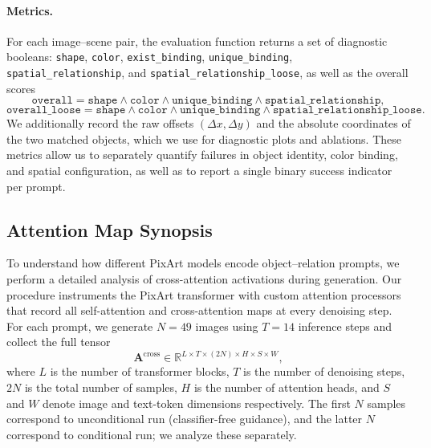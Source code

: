 \documentclass[10pt,twocolumn,letterpaper]{article}
\begin{document}
\paragraph{Metrics.}
For each image–scene pair, the evaluation function returns a set of diagnostic booleans:
\texttt{shape}, \texttt{color}, \texttt{exist\_binding}, \texttt{unique\_binding}, \texttt{spatial\_relationship}, and \texttt{spatial\_relationship\_loose}, as well as the overall scores
\[
\texttt{overall} = \texttt{shape} \land \texttt{color} \land \texttt{unique\_binding} \land \texttt{spatial\_relationship},
\]
\[
\texttt{overall\_loose} = \texttt{shape} \land \texttt{color} \land \texttt{unique\_binding} \land \texttt{spatial\_relationship\_loose}.
\]
We additionally record the raw offsets $(\Delta x,\Delta y)$ and the absolute coordinates of the two matched objects, which we use for diagnostic plots and ablations. These metrics allow us to separately quantify failures in object identity, color binding, and spatial configuration, as well as to report a single binary success indicator per prompt.

\subsection{Attention Map Synopsis}\label{method:attention_map_synopsis}

To understand how different PixArt models encode object–relation prompts, we perform a detailed analysis of cross-attention activations during generation. Our procedure instruments the PixArt transformer with custom attention processors that record all self-attention and cross-attention maps at every denoising step. For each prompt, we generate $N=49$ images using $T=14$ inference steps and collect the full tensor
\[
\mathbf{A}^{\text{cross}} \in 
\mathbb{R}^{L \times T \times (2N) \times H \times S \times W},
\]
where $L$ is the number of transformer blocks, $T$ is the number of denoising steps, $2N$ is the total number of samples, $H$ is the number of attention heads, and $S$ and $W$ denote image and text-token dimensions respectively. The first $N$ samples correspond to unconditional run (classifier-free guidance), and the latter $N$ correspond to conditional run; we analyze these separately.
\end{document}
